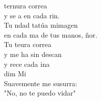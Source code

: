 \begin{cancion}[Tu ternura][Ixcís]%
	 ternura correa\\
	y se a en cada rin.\\
	Tu ndad tatúa mimagen\\
	en cada ma de tus manos, ñor.\\
	Tu teura correa\\
	y me ha sin descan\\
	y rece cada ina\\
     dim        Mi\\
Suavemente me susurra:\\
	"No, no te puedo vidar"\\
\end{cancion}%
